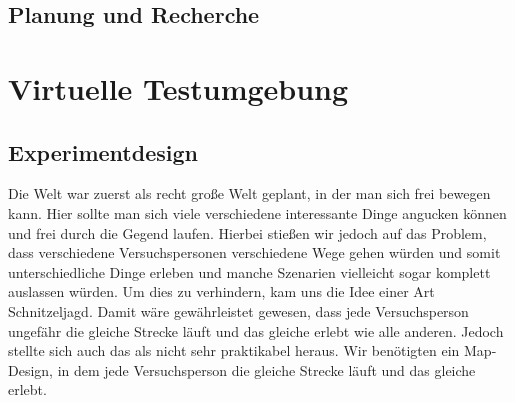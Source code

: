 \documentclass{Bericht}
\begin{document}
	
	
 

\subsection{Planung und Recherche}



\section{Virtuelle Testumgebung}

\subsection{Experimentdesign}
Die Welt war zuerst als recht große Welt geplant, in der man sich frei bewegen kann. Hier sollte man sich viele verschiedene interessante Dinge angucken können und frei durch die Gegend laufen. Hierbei stießen wir jedoch auf das Problem, dass verschiedene Versuchspersonen verschiedene Wege gehen würden und somit unterschiedliche Dinge erleben und manche Szenarien vielleicht sogar komplett auslassen würden. Um dies zu verhindern, kam uns die Idee einer Art Schnitzeljagd. Damit wäre gewährleistet gewesen, dass jede Versuchsperson ungefähr die gleiche Strecke läuft und das gleiche erlebt wie alle anderen. Jedoch stellte sich auch das als nicht sehr praktikabel heraus. Wir benötigten ein Map-Design, in dem jede Versuchsperson die gleiche Strecke läuft und das gleiche erlebt.
\end{document}
